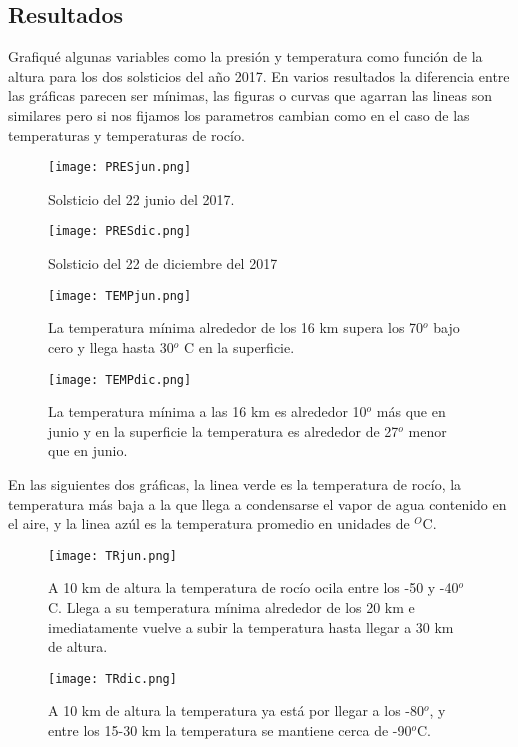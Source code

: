 \documentclass[12pt]{article}
\begin{document}
\subsection{Resultados}
\noindent 

Grafiqu\'e algunas variables como la presi\'on y temperatura como funci\'on de la altura para los dos solsticios del año 2017. En varios resultados la diferencia entre las gr\'aficas parecen ser m\'inimas, las figuras o curvas que agarran las lineas son similares pero si nos fijamos los parametros cambian como en el caso de las temperaturas y temperaturas de roc\'io. 

\begin{figure}[H]
  \centering
  \begin{minipage}[b]{0.45\textwidth}
    \texttt{[image: PRESjun.png]}
    \caption{\small Solsticio del 22 junio del 2017.}
  \end{minipage}
  \hfill
  \begin{minipage}[b]{0.45\textwidth}
    \texttt{[image: PRESdic.png]}
    \caption{\small Solsticio del 22 de diciembre del 2017}
  \end{minipage}
\end{figure}

\begin{figure}[H]
  \centering
  \begin{minipage}[b]{0.45\textwidth}
    \texttt{[image: TEMPjun.png]}
    \caption{\small La temperatura m\'inima alrededor de los 16 km supera los 70$^{o}$ bajo cero y llega hasta 30$^{o}$ C en la superficie.}
  \end{minipage}
  \hfill
  \begin{minipage}[b]{0.45\textwidth}
    \texttt{[image: TEMPdic.png]}
    \caption{\small La temperatura m\'inima a las 16 km es alrededor 10$^{o}$ m\'as que en junio y en la superficie la temperatura es alrededor de 27$^{o}$ menor que en junio. }
  \end{minipage}
\end{figure}

En las siguientes dos gr\'aficas, la linea verde es la temperatura de roc\'io, la temperatura m\'as baja a la que llega a condensarse el vapor de agua contenido en el aire, y la linea az\'ul es la temperatura promedio en unidades de $^{O}$C.

\begin{figure}[H]
  \centering
  \begin{minipage}[b]{0.45\textwidth}
    \texttt{[image: TRjun.png]}
    \caption{\small A 10 km de altura la temperatura de roc\'io ocila entre los -50 y -40$^{o}$C. Llega a su temperatura m\'inima alrededor de los 20 km e imediatamente vuelve a subir la temperatura hasta llegar a 30 km de altura.}
  \end{minipage}
  \hfill
  \begin{minipage}[b]{0.45\textwidth}
    \texttt{[image: TRdic.png]}
    \caption{\small A 10 km de altura la temperatura ya est\'a por llegar a los -80$^{o}$, y entre los 15-30 km la temperatura se mantiene cerca de -90$^{o}$C.}
  \end{minipage}
\end{figure}
\end{document}
